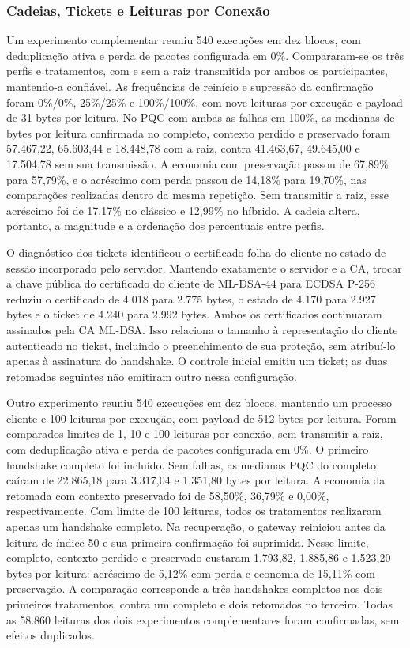 \subsubsection{Cadeias, Tickets e Leituras por Conexão}

Um experimento complementar reuniu 540 execuções em dez blocos, com deduplicação ativa e perda de pacotes configurada em 0\%. Compararam-se os três perfis e tratamentos, com e sem a raiz transmitida por ambos os participantes, mantendo-a confiável. As frequências de reinício e supressão da confirmação foram 0\%/0\%, 25\%/25\% e 100\%/100\%, com nove leituras por execução e payload de 31 bytes por leitura. No PQC com ambas as falhas em 100\%, as medianas de bytes por leitura confirmada no completo, contexto perdido e preservado foram 57.467,22, 65.603,44 e 18.448,78 com a raiz, contra 41.463,67, 49.645,00 e 17.504,78 sem sua transmissão. A economia com preservação passou de 67,89\% para 57,79\%, e o acréscimo com perda passou de 14,18\% para 19,70\%, nas comparações realizadas dentro da mesma repetição. Sem transmitir a raiz, esse acréscimo foi de 17,17\% no clássico e 12,99\% no híbrido. A cadeia altera, portanto, a magnitude e a ordenação dos percentuais entre perfis.

O diagnóstico dos tickets identificou o certificado folha do cliente no estado de sessão incorporado pelo servidor. Mantendo exatamente o servidor e a CA, trocar a chave pública do certificado do cliente de ML-DSA-44 para ECDSA P-256 reduziu o certificado de 4.018 para 2.775 bytes, o estado de 4.170 para 2.927 bytes e o ticket de 4.240 para 2.992 bytes. Ambos os certificados continuaram assinados pela CA ML-DSA. Isso relaciona o tamanho à representação do cliente autenticado no ticket, incluindo o preenchimento de sua proteção, sem atribuí-lo apenas à assinatura do handshake. O controle inicial emitiu um ticket; as duas retomadas seguintes não emitiram outro nessa configuração.

Outro experimento reuniu 540 execuções em dez blocos, mantendo um processo cliente e 100 leituras por execução, com payload de 512 bytes por leitura. Foram comparados limites de 1, 10 e 100 leituras por conexão, sem transmitir a raiz, com deduplicação ativa e perda de pacotes configurada em 0\%. O primeiro handshake completo foi incluído. Sem falhas, as medianas PQC do completo caíram de 22.865,18 para 3.317,04 e 1.351,80 bytes por leitura. A economia da retomada com contexto preservado foi de 58,50\%, 36,79\% e 0,00\%, respectivamente. Com limite de 100 leituras, todos os tratamentos realizaram apenas um handshake completo. Na recuperação, o gateway reiniciou antes da leitura de índice 50 e sua primeira confirmação foi suprimida. Nesse limite, completo, contexto perdido e preservado custaram 1.793,82, 1.885,86 e 1.523,20 bytes por leitura: acréscimo de 5,12\% com perda e economia de 15,11\% com preservação. A comparação corresponde a três handshakes completos nos dois primeiros tratamentos, contra um completo e dois retomados no terceiro. Todas as 58.860 leituras dos dois experimentos complementares foram confirmadas, sem efeitos duplicados.

